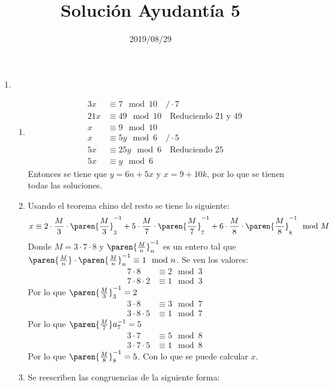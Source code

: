 \documentclass{ayudantia}
\title{Solución Ayudantía 5}
\date{2019/08/29}
\begin{document}
\maketitle
\begin{enumerate}
    \item 
    \begin{enumerate}
        \item \begin{align*}
            3x&\equiv 7\mod 10\quad/\cdot 7\\
            21x&\equiv 49\mod 10\quad\text{Reduciendo \(21\) y \(49\)}\\
            x&\equiv 9\mod 10\\
            x&\equiv 5y\mod 6\quad/\cdot 5\\
            5x&\equiv 25y\mod 6\quad\text{Reduciendo \(25\)}\\
            5x&\equiv y\mod 6
        \end{align*}
        Entonces se tiene que \(y=6n+5x\) y \(x=9+10k\), por lo que se tienen todas las soluciones.
        \item Usando el teorema chino del resto se tiene lo siguiente:
        \begin{equation*}
            x\equiv 2\cdot\frac{M}3\cdot\paren{\frac{M}3}_3^{-1}+5\cdot\frac{M}7\cdot\paren{\frac{M}7}_7^{-1}+6\cdot\frac{M}8\cdot\paren{\frac{M}8}_8^{-1}\mod M
        \end{equation*}
        Donde \(M=3\cdot7\cdot8\) y \(\paren{\frac{M}n}_n^{-1}\) es un entero tal que \( \paren{\frac{M}n}\cdot\paren{\frac{M}n}_n^{-1}\equiv 1\mod n\). Se ven los valores:
        \begin{align*}
            7\cdot 8&\equiv 2\mod 3\\
            7\cdot 8\cdot 2&\equiv 1\mod 3
        \end{align*}
        Por lo que \(\paren{\frac{M}3}_3^{-1}=2\)
        \begin{align*}
            3\cdot 8&\equiv 3\mod 7\\
            3\cdot 8\cdot 5&\equiv 1\mod 7
        \end{align*}
        Por lo que \(\paren{\frac{M}7}a_7^{-1}=5\)
        \begin{align*}
            3\cdot 7&\equiv 5\mod 8\\
            3\cdot7\cdot 5&\equiv 1\mod 8
        \end{align*}
        Por lo que \(\paren{\frac{M}8}_8^{-1}=5\). Con lo que se puede calcular \(x\).
        \item Se reescriben las congruencias de la siguiente forma:

\end{enumerate}
\end{enumerate}
\end{document}
